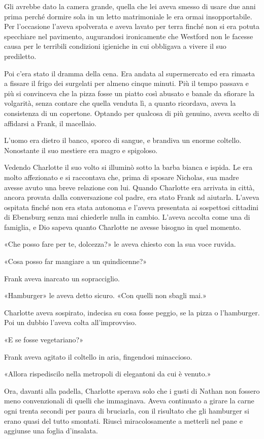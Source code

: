 \documentclass[a4paper,oneside,10pt]{memoir}
\begin{document}
Gli avrebbe dato la camera grande, quella che lei aveva smesso di usare due anni prima perché dormire sola in un letto
matrimoniale le era ormai insopportabile. Per l'occasione l'aveva spolverata e aveva lavato per terra finché non si era
potuta specchiare nel pavimento, augurandosi ironicamente che Westford non le facesse causa per le terribili condizioni
igieniche in cui obbligava a vivere il suo prediletto.

Poi c'era stato il dramma della cena. Era andata al supermercato ed era rimasta a fissare il frigo dei surgelati per
almeno cinque minuti. Più il tempo passava e più si convinceva che la pizza fosse un piatto così abusato e banale da
sfiorare la volgarità, senza contare che quella venduta lì, a quanto ricordava, aveva la consistenza di un copertone.
Optando per qualcosa di più genuino, aveva scelto di affidarsi a Frank, il macellaio.

L'uomo era dietro il banco, sporco di sangue, e brandiva un enorme coltello. Nonostante il suo mestiere era magro e
spigoloso.

Vedendo Charlotte il suo volto si illuminò sotto la barba bianca e ispida. Le era molto affezionato e si raccontava
che, prima di sposare Nicholas, sua madre avesse avuto una breve relazione con lui. Quando Charlotte era arrivata in
città, ancora provata dalla conversazione col padre, era stato Frank ad aiutarla. L'aveva ospitata finché non era
stata autonoma e l'aveva presentata ai sospettosi cittadini di Ebensburg senza mai chiederle nulla in cambio. L'aveva
accolta come una di famiglia, e Dio sapeva quanto Charlotte ne avesse bisogno in quel momento.

«Che posso fare per te, dolcezza?» le aveva chiesto con la sua voce ruvida.

«Cosa posso far mangiare a un quindicenne?»

Frank aveva inarcato un sopracciglio.

«Hamburger» le aveva detto sicuro. «Con quelli non sbagli mai.»

Charlotte aveva sospirato, indecisa su cosa fosse peggio, se la pizza o l'hamburger. Poi un dubbio l'aveva colta
all'improvviso.

«E se fosse vegetariano?»

Frank aveva agitato il coltello in aria, fingendosi minaccioso.

«Allora rispediscilo nella metropoli di elegantoni da cui è venuto.»

Ora, davanti alla padella, Charlotte sperava solo che i gusti di Nathan non fossero meno convenzionali di quelli che
immaginava. Aveva continuato a girare la carne ogni trenta secondi per paura di bruciarla, con il risultato che gli
hamburger si erano quasi del tutto smontati. Riuscì miracolosamente a metterli nel pane e aggiunse una foglia
d'insalata.
\end{document}
